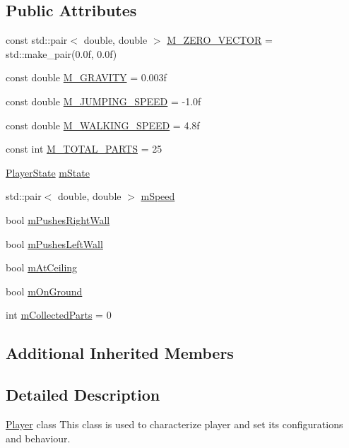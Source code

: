 \subsection*{Public Attributes}
\begin{DoxyCompactItemize}
\item 
const std\+::pair$<$ double, double $>$ \hyperlink{class_azo_1_1_player_a7c56f1e510b86c4719bef956b69befa4}{M\+\_\+\+Z\+E\+R\+O\+\_\+\+V\+E\+C\+T\+OR} = std\+::make\+\_\+pair(0.\+0f, 0.\+0f)
\item 
const double \hyperlink{class_azo_1_1_player_a2daa546daa4c5f15640d703fdde56059}{M\+\_\+\+G\+R\+A\+V\+I\+TY} = 0.\+003f
\item 
const double \hyperlink{class_azo_1_1_player_a926fea900dde401f4b2b5faa28bfa7c6}{M\+\_\+\+J\+U\+M\+P\+I\+N\+G\+\_\+\+S\+P\+E\+ED} = -\/1.\+0f
\item 
const double \hyperlink{class_azo_1_1_player_a597ac6977889f5bef7f95aaf13ff3f85}{M\+\_\+\+W\+A\+L\+K\+I\+N\+G\+\_\+\+S\+P\+E\+ED} = 4.\+8f
\item 
const int \hyperlink{class_azo_1_1_player_a4cd316a415fb0af5d4179a6cd32a2ab2}{M\+\_\+\+T\+O\+T\+A\+L\+\_\+\+P\+A\+R\+TS} = 25
\item 
\hyperlink{namespace_azo_ab6013e2aec3a179604cef5ea80418e33}{Player\+State} \hyperlink{class_azo_1_1_player_a6c500f32806b1450aaf2acb66ae5b9bf}{m\+State}
\item 
std\+::pair$<$ double, double $>$ \hyperlink{class_azo_1_1_player_a545f3a8fe6ace68bc67f9573ba179b3b}{m\+Speed}
\item 
bool \hyperlink{class_azo_1_1_player_a777f7f3207c772734e886188c85523fe}{m\+Pushes\+Right\+Wall}
\item 
bool \hyperlink{class_azo_1_1_player_a49cc98a0198d753b53837cdd6d35539d}{m\+Pushes\+Left\+Wall}
\item 
bool \hyperlink{class_azo_1_1_player_a3bd316a4da8a7b1da0b9844a3d6b1e49}{m\+At\+Ceiling}
\item 
bool \hyperlink{class_azo_1_1_player_af525a6da7698c344f378ece79dcd28bc}{m\+On\+Ground}
\item 
int \hyperlink{class_azo_1_1_player_a7d2a2c8e92e8fd22aa1dc220fd6d6df7}{m\+Collected\+Parts} = 0
\end{DoxyCompactItemize}
\subsection*{Additional Inherited Members}


\subsection{Detailed Description}
\hyperlink{class_azo_1_1_player}{Player} class This class is used to characterize player and set its configurations and behaviour. 

